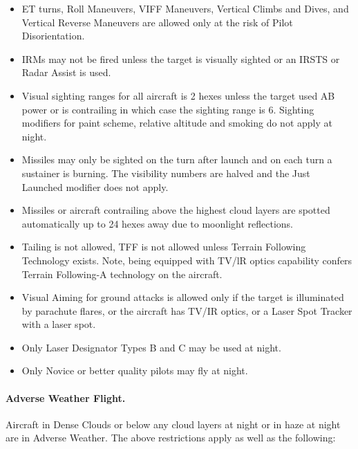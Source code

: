 \begin{advancedrules}
\begin{itemize}

    \item ET turns, Roll Maneuvers, VIFF Maneuvers, Vertical Climbs and Dives, and Vertical Reverse Maneuvers are allowed only at the risk of Pilot Disorientation.

    \item IRMs may not be fired unless the target is visually sighted or an IRSTS or Radar Assist is used.

    \item Visual sighting ranges for all aircraft is 2 hexes unless the target used AB power or is contrailing in which case the sighting range is 6. Sighting modifiers for paint scheme, relative altitude and smoking do not apply at night.

    \item Missiles may only be sighted on the turn after launch and on each turn a sustainer is burning. The visibility numbers are halved and the Just Launched modifier does not apply.

    \item Missiles or aircraft contrailing above the highest cloud layers are spotted automatically up to 24 hexes away due to moonlight reflections.

    \item Tailing is not allowed, TFF is not allowed unless Terrain Following Technology exists. Note, being equipped with TV/lR optics capability confers Terrain Following-A technology on the aircraft.

    \item Visual Aiming for ground attacks is allowed only if the target is illuminated by parachute flares, or the aircraft has TV/IR optics, or a Laser Spot Tracker with a laser spot.

    \item Only Laser Designator Types B and C may be used at night.

    \item Only Novice or better quality pilots may fly at night.

\end{itemize}

\paragraph{Adverse Weather Flight.} Aircraft in Dense Clouds or below any cloud layers at night or in haze at night are in Adverse Weather. The above restrictions apply as well as the following:


\end{advancedrules}
